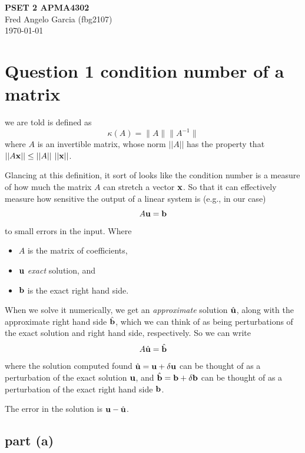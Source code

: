 \documentclass[12pt]{article}
\begin{document}
\begin{flushleft}
\textbf{PSET 2 APMA4302} \\
Fred Angelo Garcia (fbg2107) \\
\today
\end{flushleft}

\vspace{0.1in}

\section{Question 1 condition number of a matrix}
we are told is defined as 
\begin{equation}
    \kappa(A) = \|A\| \|A^{-1}\|
\end{equation}
where $A$ is an invertible matrix, whose norm $||A||$ has the property that $||A{\bf x}|| \leq ||A||~ ||{\bf x}||$.

Glancing at this definition, it sort of looks like the condition number is a measure of how much the matrix $A$ can stretch a vector ${\bf x}$. So that it can effectively measure how sensitive the output of a linear system is (e.g., in our case)
\begin{equation}
    A{\bf u} = {\bf b}
\end{equation}
to small errors in the input. Where 
\begin{itemize}
    \item $A$ is the matrix of coefficients,
    \item ${\bf u}$ \textit{exact} solution, and
    \item ${\bf b}$ is the exact right hand side.
\end{itemize}

When we solve it numerically, we get an \textit{approximate} solution $\hat{\bf u}$, along with the approximate right hand side $\hat{\bf b}$, which we can think of as being perturbations of the exact solution and right hand side, respectively. So we can write
\begin{equation}
    A\hat{\bf u} = \hat{\bf b}
\end{equation}
where the solution computed found $\hat{\bf u} = {\bf u} + \delta {\bf u}$ can be thought of as a perturbation of the exact solution ${\bf u}$, and $\hat{\bf b} = {\bf b} + \delta {\bf b}$ can be thought of as a perturbation of the exact right hand side ${\bf b}$.

The error in the solution is ${\bf u} - \hat{\bf u}$. 

\subsection{part (a)}
\end{document}
